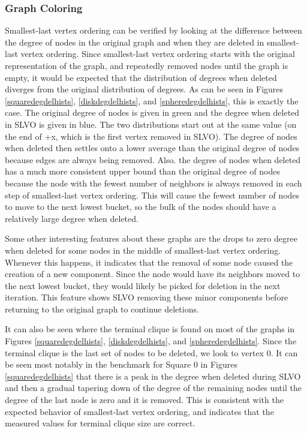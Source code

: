 \documentclass{article}
\begin{document}
        \subsubsection{Graph Coloring}
        Smallest-last vertex ordering can be verified by looking at the difference between the degree of nodes in the original graph and when they are deleted in smallest-last vertex ordering. Since smallest-last vertex ordering starts with the original representation of the graph, and repeatedly removed nodes until the graph is empty, it would be expected that the distribution of degrees when deleted diverges from the original distribution of degrees. As can be seen in Figures \ref{squaredegdelhists}, \ref{diskdegdelhists}, and \ref{spheredegdelhists}, this is exactly the case. The original degree of nodes is given in green and the degree when deleted in SLVO is given in blue. The two distributions start out at the same value (on the end of +x, which is the first vertex removed in SLVO). The degree of nodes when deleted then settles onto a lower average than the original degree of nodes because edges are always being removed. Also. the degree of nodes when deleted has a much more consistent upper bound than the original degree of nodes because the node with the fewest number of neighbors is always removed in each step of smallest-last vertex ordering. This will cause the fewest number of nodes to move to the next lowest bucket, so the bulk of the nodes should have a relatively large degree when deleted.
        \par
        Some other interesting features about these graphs are the drops to zero degree when deleted for some nodes in the middle of smallest-last vertex ordering. Whenever this happens, it indicates that the removal of some node caused the creation of a new component. Since the node would have its neighbors moved to the next lowest bucket, they would likely be picked for deletion in the next iteration. This feature shows SLVO removing these minor components before returning to the original graph to continue deletions.
        \par
        It can also be seen where the terminal clique is found on most of the graphs in Figures \ref{squaredegdelhists}, \ref{diskdegdelhists}, and \ref{spheredegdelhists}. Since the terminal clique is the last set of nodes to be deleted, we look to vertex 0. It can be seen most notably in the benchmark for Square 0 in Figures \ref{squaredegdelhists} that there is a peak in the degree when deleted during SLVO and then a gradual tapering down of the degree of the remaining nodes until the degree of the last node is zero and it is removed. This is consistent with the expected behavior of smallest-last vertex ordering, and indicates that the measured values for terminal clique size are correct.
\end{document}
